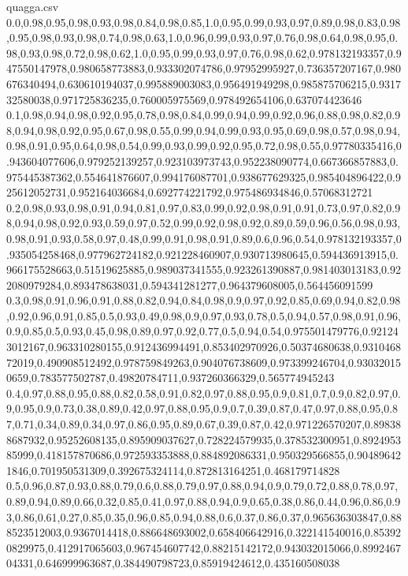 \documentclass{llncs}
\begin{document}
\begin{filecontents*}{quagga.csv}
0.0,0.98,0.95,0.98,0.93,0.98,0.84,0.98,0.85,1.0,0.95,0.99,0.93,0.97,0.89,0.98,0.83,0.98,0.95,0.98,0.93,0.98,0.74,0.98,0.63,1.0,0.96,0.99,0.93,0.97,0.76,0.98,0.64,0.98,0.95,0.98,0.93,0.98,0.72,0.98,0.62,1.0,0.95,0.99,0.93,0.97,0.76,0.98,0.62,0.978132193357,0.947550147978,0.980658773883,0.933302074786,0.97952995927,0.736357207167,0.980676340494,0.630610194037,0.995889003083,0.956491949298,0.985875706215,0.931732580038,0.971725836235,0.760005975569,0.978492654106,0.637074423646
0.1,0.98,0.94,0.98,0.92,0.95,0.78,0.98,0.84,0.99,0.94,0.99,0.92,0.96,0.88,0.98,0.82,0.98,0.94,0.98,0.92,0.95,0.67,0.98,0.55,0.99,0.94,0.99,0.93,0.95,0.69,0.98,0.57,0.98,0.94,0.98,0.91,0.95,0.64,0.98,0.54,0.99,0.93,0.99,0.92,0.95,0.72,0.98,0.55,0.97780335416,0.943604077606,0.979252139257,0.923103973743,0.952238090774,0.667366857883,0.975445387362,0.554641876607,0.994176087701,0.938677629325,0.985404896422,0.925612052731,0.952164036684,0.692774221792,0.975486934846,0.57068312721
0.2,0.98,0.93,0.98,0.91,0.94,0.81,0.97,0.83,0.99,0.92,0.98,0.91,0.91,0.73,0.97,0.82,0.98,0.94,0.98,0.92,0.93,0.59,0.97,0.52,0.99,0.92,0.98,0.92,0.89,0.59,0.96,0.56,0.98,0.93,0.98,0.91,0.93,0.58,0.97,0.48,0.99,0.91,0.98,0.91,0.89,0.6,0.96,0.54,0.978132193357,0.935054258468,0.977962724182,0.921228460907,0.930713980645,0.594436913915,0.966175528663,0.51519625885,0.989037341555,0.923261390887,0.981403013183,0.922080979284,0.893478638031,0.594341281277,0.964379608005,0.564456091599
0.3,0.98,0.91,0.96,0.91,0.88,0.82,0.94,0.84,0.98,0.9,0.97,0.92,0.85,0.69,0.94,0.82,0.98,0.92,0.96,0.91,0.85,0.5,0.93,0.49,0.98,0.9,0.97,0.93,0.78,0.5,0.94,0.57,0.98,0.91,0.96,0.9,0.85,0.5,0.93,0.45,0.98,0.89,0.97,0.92,0.77,0.5,0.94,0.54,0.975501479776,0.921243012167,0.963310280155,0.912436994491,0.853402970926,0.50374680638,0.931046872019,0.490908512492,0.978759849263,0.904076738609,0.973399246704,0.930320150659,0.783577502787,0.49820784711,0.937260366329,0.565774945243
0.4,0.97,0.88,0.95,0.88,0.82,0.58,0.91,0.82,0.97,0.88,0.95,0.9,0.81,0.7,0.9,0.82,0.97,0.9,0.95,0.9,0.73,0.38,0.89,0.42,0.97,0.88,0.95,0.9,0.7,0.39,0.87,0.47,0.97,0.88,0.95,0.87,0.71,0.34,0.89,0.34,0.97,0.86,0.95,0.89,0.67,0.39,0.87,0.42,0.971226570207,0.898388687932,0.95252608135,0.895909037627,0.728224579935,0.378532300951,0.892495385999,0.418157870686,0.972593353888,0.884892086331,0.950329566855,0.904896421846,0.701950531309,0.392675324114,0.872813164251,0.468179714828
0.5,0.96,0.87,0.93,0.88,0.79,0.6,0.88,0.79,0.97,0.88,0.94,0.9,0.79,0.72,0.88,0.78,0.97,0.89,0.94,0.89,0.66,0.32,0.85,0.41,0.97,0.88,0.94,0.9,0.65,0.38,0.86,0.44,0.96,0.86,0.93,0.86,0.61,0.27,0.85,0.35,0.96,0.85,0.94,0.88,0.6,0.37,0.86,0.37,0.965636303847,0.888523512003,0.9367014418,0.886648693002,0.658406642916,0.322141540016,0.853920829975,0.412917065603,0.967454607742,0.88215142172,0.943032015066,0.899246704331,0.646999963687,0.384490798723,0.85919424612,0.435160508038

\end{filecontents*}
\end{document}
